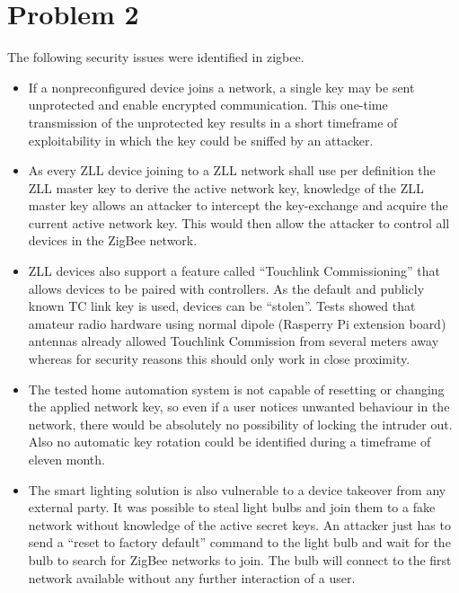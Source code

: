 \documentclass[10pt]{article}
\begin{document}
\section{Problem 2}
The following security issues were identified in zigbee.
\begin{itemize}
\item If a nonpreconfigured device joins a network, a single key may be sent unprotected and enable encrypted communication. This one-time transmission of the unprotected key results in a short timeframe of
exploitability in which the key could be sniffed by an attacker. 

\item As every ZLL device joining to a ZLL network shall use per definition the ZLL master key to derive the active network key, knowledge of the ZLL master key allows an attacker to intercept the key-exchange and acquire the current active network key. This would then allow the attacker to control all devices in the ZigBee network.

\item ZLL devices also support a feature called “Touchlink Commissioning” that allows devices to be paired with controllers. As the default and publicly known TC link key is used, devices can be “stolen”. Tests showed that amateur radio hardware using normal dipole (Rasperry Pi extension board) antennas already allowed Touchlink Commission from several meters away whereas for security reasons this should only work in close proximity.

\item The tested home automation system is not capable of resetting or changing the applied network key, so even if a user notices unwanted behaviour in the network, there would be absolutely no possibility of locking the intruder out. Also no automatic key rotation could be
identified during a timeframe of eleven month.

\item The smart lighting solution is also vulnerable to a device takeover from any external party. It was possible to steal light bulbs and join them to a fake network without knowledge of the active secret keys. An attacker just has to send a “reset to factory default” command to the light bulb and wait for the bulb to search for ZigBee networks to
join. The bulb will connect to the first network available without any further interaction of a user.


\end{itemize}
\end{document}
